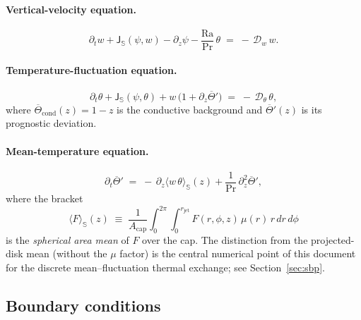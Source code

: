 \documentclass[11pt]{article}
\newcommand{\Jsphere}{\mathsf{J}_{\mathbb{S}}}
\newcommand{\meanS}[1]{\langle #1 \rangle_{\mathbb{S}}}
\newcommand{\Ra}{\mathrm{Ra}}
\newcommand{\Pr}{\mathrm{Pr}}
\newcommand{\rjet}{r_{\mathrm{jet}}}
\begin{document}
\paragraph{Vertical-velocity equation.}
\begin{equation}
  \partial_{t} w + \Jsphere(\psi, w)
  - \partial_{z}\psi
  - \frac{\Ra}{\Pr}\,\theta
  \;=\; -\,\mathcal{D}_{w}\,w.
  \label{eq:w-eq}
\end{equation}

\paragraph{Temperature-fluctuation equation.}
\begin{equation}
  \partial_{t}\theta + \Jsphere(\psi, \theta)
  + w\,\bigl(1 + \partial_{z}\overline{\Theta}'\bigr)
  \;=\; -\,\mathcal{D}_{\theta}\,\theta,
  \label{eq:theta-eq}
\end{equation}
where $\overline{\Theta}_{\mathrm{cond}}(z) = 1-z$ is the conductive
background and $\overline{\Theta}'(z)$ is its prognostic deviation.

\paragraph{Mean-temperature equation.}
\begin{equation}
  \boxed{\;\;
  \partial_{t}\overline{\Theta}'
  \;=\; -\,\partial_{z}\meanS{w\,\theta}(z)
  + \frac{1}{\Pr}\,\partial_{z}^{2}\overline{\Theta}',
  \;\;}
  \label{eq:meantemp-eq}
\end{equation}
where the bracket
\begin{equation}
  \meanS{F}(z) \;\equiv\;
  \frac{1}{A_{\mathrm{cap}}} \int_{0}^{2\pi}\!\!\int_{0}^{\rjet}
  F(r,\phi,z)\,\mu(r)\,r\,dr\,d\phi
  \label{eq:sphmean}
\end{equation}
is the \emph{spherical area mean} of $F$ over the cap.  The
distinction from the projected-disk mean (without the $\mu$ factor)
is the central numerical point of this document for the discrete
mean--fluctuation thermal exchange; see Section~\ref{sec:sbp}.

\subsection{Boundary conditions}
\label{sec:bcs}
\end{document}
